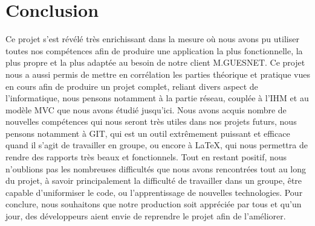 \section*{Conclusion}

	Ce projet s'est révélé très enrichissant dans la mesure où nous avons pu utiliser toutes nos compétences afin de produire une application la plus fonctionnelle, la plus propre et la plus adaptée au besoin de notre client M.GUESNET.\newline
	Ce projet nous a aussi permis de mettre en corrélation les parties théorique et pratique vues en cours afin de produire un projet complet, reliant divers aspect de l'informatique, nous pensons notamment à la partie réseau, couplée à l'IHM et au modèle MVC que nous avons étudié jusqu'ici.
	Nous avons acquis nombre de nouvelles compétences qui nous seront très utiles dans nos projets futurs, nous pensons notamment à GIT, qui est un outil extrêmement puissant et efficace quand il s'agit de travailler en groupe, ou encore à \LaTeX{}, qui nous permettra de rendre des rapports très beaux et fonctionnels.\newline
	Tout en restant positif, nous n'oublions pas les nombreuses difficultés que nous avons rencontrées tout au long du projet, à savoir principalement la difficulté de travailler dans un groupe, être capable d'uniformiser le code, ou l'apprentissage de nouvelles technologies.\newline
	Pour conclure, nous souhaitons que notre production soit appréciée par tous et qu'un jour, des développeurs aient envie de reprendre le projet afin de l'améliorer.

